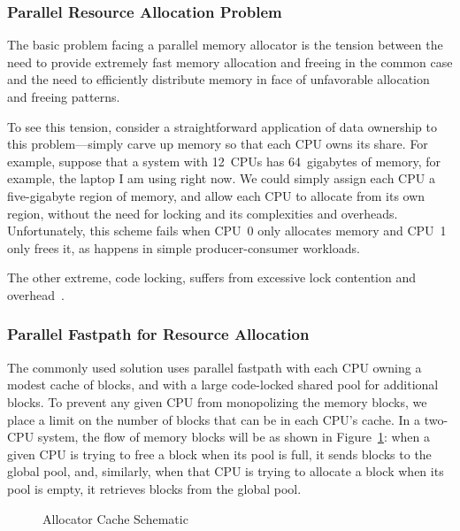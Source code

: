 \subsubsection{Parallel Resource Allocation Problem}

The basic problem facing a parallel memory allocator is the tension
between the need to provide extremely fast memory allocation and
freeing in the common case and the need to efficiently distribute
memory in face of unfavorable allocation and freeing patterns.

To see this tension, consider a straightforward application of
data ownership to this problem---simply carve up memory so that
each CPU owns its share.
For example, suppose that a system with 12~CPUs has 64~gigabytes
of memory, for example, the laptop I am using right now.
We could simply assign each CPU a five-gigabyte region of memory,
and allow each CPU to allocate from its own region, without the need
for locking and its complexities and overheads.
Unfortunately, this scheme fails when CPU~0 only allocates memory and
CPU~1 only frees it, as happens in simple producer-consumer workloads.

The other extreme, code locking, suffers from excessive lock contention
and overhead~\cite{McKenney93}.

\subsubsection{Parallel Fastpath for Resource Allocation}
\label{sec:SMPdesign:Parallel Fastpath for Resource Allocation}

The commonly used solution uses parallel fastpath with each CPU
owning a modest cache of blocks, and with a large code-locked
shared pool for additional blocks.
To prevent any given CPU from monopolizing the memory blocks,
we place a limit on the number of blocks that can be in each CPU's
cache.
In a two-CPU system, the flow of memory blocks will be as shown
in Figure~\ref{fig:SMPdesign:Allocator Cache Schematic}:
when a given CPU is trying to free a block when its pool is full,
it sends blocks to the global pool, and, similarly, when that CPU
is trying to allocate a block when its pool is empty, it retrieves
blocks from the global pool.

\begin{figure}[tbp]
\centering
{}
\caption{Allocator Cache Schematic}
\label{fig:SMPdesign:Allocator Cache Schematic}
\end{figure}


